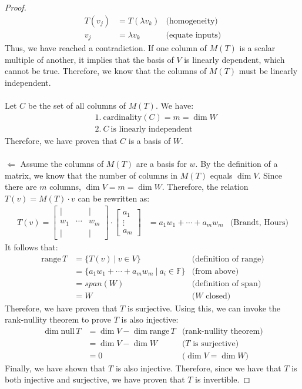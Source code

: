 \documentclass[12pt,reqno]{article}
\theoremstyle{definition}
\begin{document}
\begin{proof}
\begin{align*}
        T(v_j) &= T(\lambda v_k) & \text{(homogeneity)}\\
        v_j &= \lambda v_k & \text{(equate inputs)}
    \end{align*}
    Thus, we have reached a contradiction. If one column of $M(T)$ is a scalar multiple of another, it implies that the basis of $V$ is linearly dependent, which cannot be true. Therefore, we know that the columns of $M(T)$ must be linearly independent.
    \\\\
    Let $C$ be the set of all columns of $M(T)$. We have:
    \begin{align*}
        &1.\ \mathrm{cardinality}(C) = m = \dim W\\
        &2.\ C\ \text{is linearly independent}
    \end{align*}
    Therefore, we have proven that $C$ is a basis of $W$.
    \\\\
    $\Leftarrow$ Assume the columns of $M(T)$ are a basis for $w$. By the definition of a matrix, we know that the number of columns in $M(T)$ equals $\dim V$. Since there are $m$ columns, $\dim V = m = \dim W$. Therefore, the relation $T(v) = M(T) \cdot v$ can be rewritten as:
    \begin{align*}
        T(v) =
        \begin{bmatrix}
            | & & |\\
            w_1 & \cdots & w_m\\
            | & & |
        \end{bmatrix}
        \cdot
        \begin{bmatrix}
             a_1 \\
            \vdots \\
            a_m
        \end{bmatrix}
        &= a_1w_1 + \cdots + a_mw_m
        & \text{(Brandt, Hours)}
    \end{align*}
    It follows that:
    \begin{align*}
        \mathrm{range}\,T &= \{T(v)\ |\ v\in V\} & \text{(definition of range)}\\
        &= \{a_1w_1+\cdots+a_mw_m\ |\ a_i\in \mathbb{F}\} & \text{(from above)}\\
        &= span(W) & \text{(definition of span)}\\
        &= W & \text{($W$ closed)}
    \end{align*}
    Therefore, we have proven that $T$ is surjective. Using this, we can invoke the rank-nullity theorem to prove $T$ is also injective:
    \begin{align*}
        \dim \mathrm{null}\,T &= \dim V - \dim \mathrm{range}\,T &\text{(rank-nullity theorem)}\\
        &= \dim V - \dim W &\text{($T$ is surjective)}\\
        &= 0 &\text{($\dim V = \dim W$)}
    \end{align*}
    Finally, we have shown that $T$ is also injective. Therefore, since we have that $T$ is both injective and surjective, we have proven that $T$ is invertible.
\end{proof}
\end{document}

